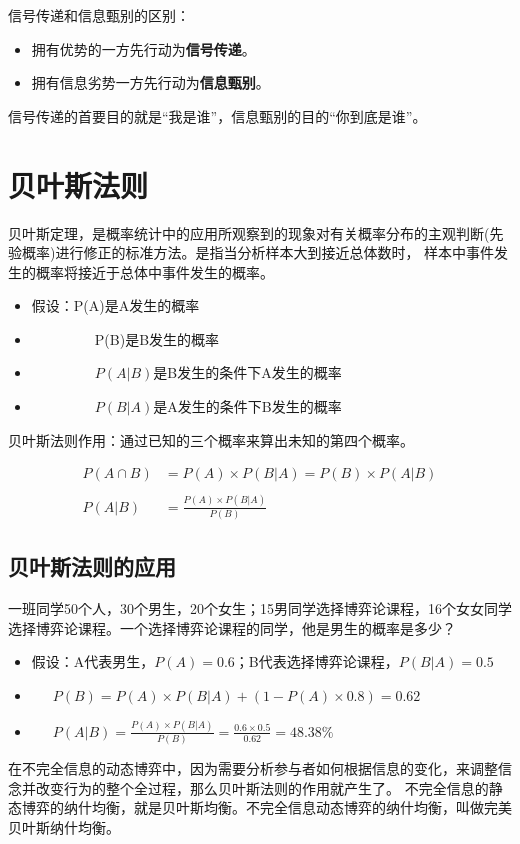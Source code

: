 \documentclass[12pt, a4paper]{article} %
\begin{document}
\begin{CJK*}{UTF8}{gbsn}
    信号传递和信息甄别的区别：
    \begin{itemize}
        \item 拥有优势的一方先行动为\textbf{信号传递}。
        \item 拥有信息劣势一方先行动为\textbf{信息甄别}。
    \end{itemize}
    信号传递的首要目的就是“我是谁”，信息甄别的目的“你到底是谁”。

    \clearpage
    \section{贝叶斯法则}
    贝叶斯定理，是概率统计中的应用所观察到的现象对有关概率分布的主观判断(先验概率)进行修正的标准方法。是指当分析样本大到接近总体数时，
    样本中事件发生的概率将接近于总体中事件发生的概率。\par
    \begin{itemize}
        \item[] 假设：P(A)是A发生的概率
        \item[] ~~~~~~~~~P(B)是B发生的概率
        \item[] ~~~~~~~~~$P(A|B)$是B发生的条件下A发生的概率
        \item[] ~~~~~~~~~$P(B|A)$是A发生的条件下B发生的概率
    \end{itemize}
    贝叶斯法则作用：通过已知的三个概率来算出未知的第四个概率。

    \begin{align*}
        P(A \cap B) &= P(A) \times P(B|A) = P(B) \times P(A|B) \\
        \\
        P(A|B) &= \frac{P(A) \times P(B|A)}{P(B)}
    \end{align*}

    \subsection{贝叶斯法则的应用}
    一班同学50个人，30个男生，20个女生；15男同学选择博弈论课程，16个女女同学选择博弈论课程。一个选择博弈论课程的同学，他是男生的概率是多少？
    \begin{itemize}
        \item[]  假设：A代表男生，$P(A)=0.6$；B代表选择博弈论课程，$P(B|A)=0.5$
        \item[] ~~~$P(B)=P(A) \times P(B|A)+(1-P(A) \times 0.8)=0.62$
        \item[] ~~~$P(A|B)=\frac{P(A) \times P(B|A)}{P(B)}=\frac{0.6 \times 0.5}{0.62}=48.38\%$
    \end{itemize}
    在不完全信息的动态博弈中，因为需要分析参与者如何根据信息的变化，来调整信念并改变行为的整个全过程，那么贝叶斯法则的作用就产生了。
    不完全信息的静态博弈的纳什均衡，就是贝叶斯均衡。不完全信息动态博弈的纳什均衡，叫做完美贝叶斯纳什均衡。


\end{CJK*}
\end{document}

